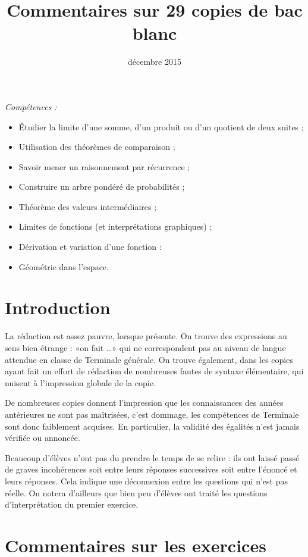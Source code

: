 \documentclass[12pt,a4paper]{article}
\title{Commentaires sur 29 copies de bac blanc}
\author{\bsc{Jumel}}
\date{décembre 2015}
\makeatletter
\renewcommand{\maketitle}%
{\framebox{%
    \begin{minipage}{0.98\linewidth}%
      \begin{center}%
        \Large \@title ~-- \@author \\%
        \@date%
      \end{center}%
  \end{minipage}}%
  \normalsize%
}
\theoremstyle{break}
\theoremstyle{nobreak}
\theoremstyle{nonumberplain}
\makeatother
\begin{document}
\maketitle

\emph{Compétences :}
\begin{itemize}
  \item Étudier la limite d'une somme, d'un produit ou d'un quotient de
    deux suites ;
  \item Utilisation des théorèmes de comparaison ;
  \item Savoir mener un raisonnement par récurrence ;
  \item Construire un arbre pondéré de probabilités ;
  \item Théorème des valeurs intermédiaires ;
  \item Limites de fonctions (et interprétations graphiques) ;
  \item Dérivation et variation d'une fonction :
  \item Géométrie dans l'espace.
\end{itemize}

\section*{Introduction}
La rédaction est assez pauvre, lorsque présente. On trouve des
expressions au sens bien étrange : «on fait …» qui ne correspondent pas
au niveau de langue attendue en classe de Terminale générale. On trouve
également, dans les copies ayant fait un effort de rédaction de
nombreuses fautes de syntaxe élémentaire, qui nuisent à l'impression
globale de la copie.

De nombreuses copies donnent l'impression que les connaissances des
années antérieures ne sont pas maîtrisées, c'est dommage, les
compétences de Terminale sont donc faiblement acquises. En particulier,
la validité des égalités n'est jamais vérifiée ou annoncée.

Beaucoup d'élèves n'ont pas du prendre le temps de se relire : ils ont
laissé passé de graves incohérences soit entre leurs réponses
successives soit entre l'énoncé et leurs réponses. Cela indique une
déconnexion entre les questions qui n'est pas réelle. On notera
d'ailleurs que bien peu d'élèves ont traité les questions
d'interprétation du premier exercice.

\section*{Commentaires sur les exercices}
\end{document}
